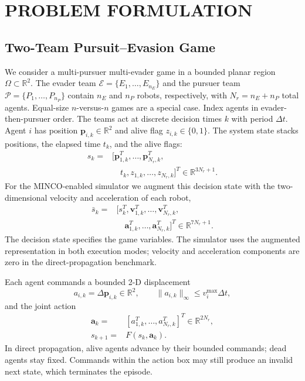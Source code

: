 \documentclass[letterpaper,10pt,conference]{ieeeconf}
\begin{document}
\section{PROBLEM FORMULATION}

\subsection{Two-Team Pursuit--Evasion Game}

We consider a multi-pursuer multi-evader game in a bounded planar region
$\Omega\subset\mathbb R^2$. The evader team
$\mathcal{E}=\{E_1,\ldots,E_{n_E}\}$ and the pursuer team
$\mathcal{P}=\{P_1,\ldots,P_{n_P}\}$ contain $n_E$ and $n_P$ robots,
respectively, with $N_r=n_E+n_P$ total agents. Equal-size $n$-versus-$n$
games are a special case. Index agents in evader-then-pursuer order.
The teams act at discrete decision times
$k$ with period $\Delta t$. Agent $i$ has position
$\mathbf{p}_{i,k}\in\mathbb{R}^2$ and alive flag
$z_{i,k}\in\{0,1\}$. The system state stacks positions, the elapsed time
$t_k$, and the alive flags:
\begin{equation}
\begin{aligned}
s_k={}&[\mathbf p_{1,k}^{T},\ldots,\mathbf p_{N_r,k}^{T},\\[-1mm]
      &\quad t_k,z_{1,k},\ldots,z_{N_r,k}]^{T}
      \in\mathbb R^{3N_r+1}.
\end{aligned}
\end{equation}
For the MINCO-enabled simulator we augment this decision state with the
two-dimensional velocity and acceleration of each robot,
\begin{equation}
\begin{aligned}
\bar s_k={}&[s_k^T,\mathbf v_{1,k}^T,\ldots,\mathbf v_{N_r,k}^T,\\[-1mm]
            &\quad\mathbf a_{1,k}^T,\ldots,\mathbf a_{N_r,k}^T]^T
            \in\mathbb R^{7N_r+1}.
\end{aligned}
\end{equation}
The decision state specifies the game variables. The simulator uses
the augmented representation in both execution modes; velocity and
acceleration components are zero in the direct-propagation benchmark.

Each agent commands a bounded 2-D displacement
\begin{equation}
a_{i,k}=\Delta\mathbf{p}_{i,k}\in\mathbb{R}^2,\qquad
\|a_{i,k}\|_\infty \le v_i^{\max}\Delta t ,
\end{equation}
and the joint action
\begin{equation}
\begin{aligned}
\mathbf a_k={}&[a_{1,k}^{T},\ldots,a_{N_r,k}^{T}]^{T}
                 \in\mathbb R^{2N_r},\\
s_{k+1}={}&F(s_k,\mathbf a_k).
\end{aligned}
\end{equation}
In direct propagation, alive agents advance by their bounded commands;
dead agents stay fixed. Commands within the action box may still produce
an invalid next state, which terminates the episode.
\end{document}
